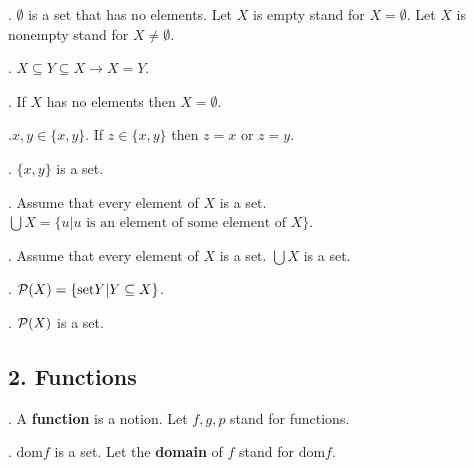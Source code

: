 \begin{definition}.
$\emptyset$ is a set that has no elements.
Let $X$ is empty stand for $X = \emptyset$.
Let $X$ is nonempty stand for $X \neq \emptyset$.
\end{definition}

\begin{axiom}.
$X \subseteq Y \subseteq X  \rightarrow  X = Y$.
\end{axiom}

\begin{lemma}.
If $X$ has no elements then $X=\emptyset$.
\end{lemma}

\begin{lemma}.$x,y \in \{x,y\}$. If $z \in \{x,y\}$ then $z=x$ or $z=y$.
\end{lemma}

\begin{lemma}.
$\{x,y\}$ is a set.
\end{lemma} 

\begin{definition}.
Assume that every element of $X$ is a set.
$\bigcup X = \{ u | u \text{ is an element of some element of } X\}$.
\end{definition}

\begin{axiom}.
Assume that every element of $X$ is a set.
$\bigcup X$ is a set.
\end{axiom}

\begin{definition}.
${\cal P}(X) = \{\text{set} Y | Y \subseteq X \}$.
\end{definition}

\begin{axiom}.
${\cal P}(X)$ is a set.
\end{axiom}

\subsection{2. Functions}


\begin{signature}.
A {\bf function} is a notion.
Let $f,g,p$ stand for functions.
\end{signature}

\begin{signature}.
$\text{dom} f$ is a set. Let the {\bf domain} of $f$ stand for 
$\text{dom} f$.
\end{signature}

